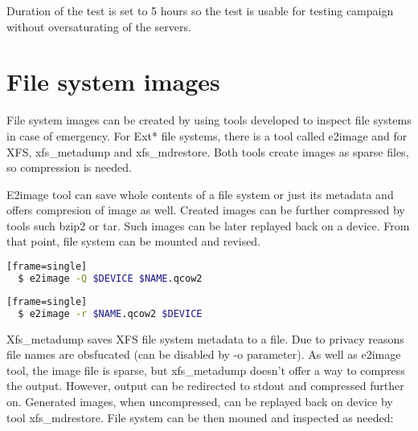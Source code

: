 \documentclass[
  color, %
  table, %
  lof,   %
  lot,   %
]{fithesis3}
\begin{document}

Duration of the test is set to 5 hours so the test is usable for testing campaign without oversaturating of the servers.

\section{File system images}
File system images can be created by using tools developed to inspect file systems in case of emergency. For Ext* file systems, there is a tool called e2image and for XFS, xfs\_metadump and xfs\_mdrestore. Both tools create images as sparse files, so compression is needed.

E2image tool can save whole contents of a file system or just its metadata and offers compresion of image as well. Created images can be further compressed by tools such bzip2 or tar. Such images can be later replayed back on a device. From that point, file system can be mounted and revised.


\begin{lstlisting}[language=bash, caption={Creating compressed image using e2image}][frame=single]
  $ e2image -Q $DEVICE $NAME.qcow2
\end{lstlisting}

\begin{lstlisting}[language=bash, caption={Reloading compressed image}][frame=single]
  $ e2image -r $NAME.qcow2 $DEVICE
\end{lstlisting}

Xfs\_metadump saves XFS file system metadata to a file. Due to privacy reasons file names are obsfucated (can be disabled by -o parameter). As well as e2image tool, the image file is sparse, but xfs\_metadump doesn't offer a way to compress the output. However, output can be redirected to stdout and compressed further on. Generated images, when uncompressed, can be replayed back on device by tool xfs\_mdrestore. File system can be then mouned and inspected as needed:
\end{document}

